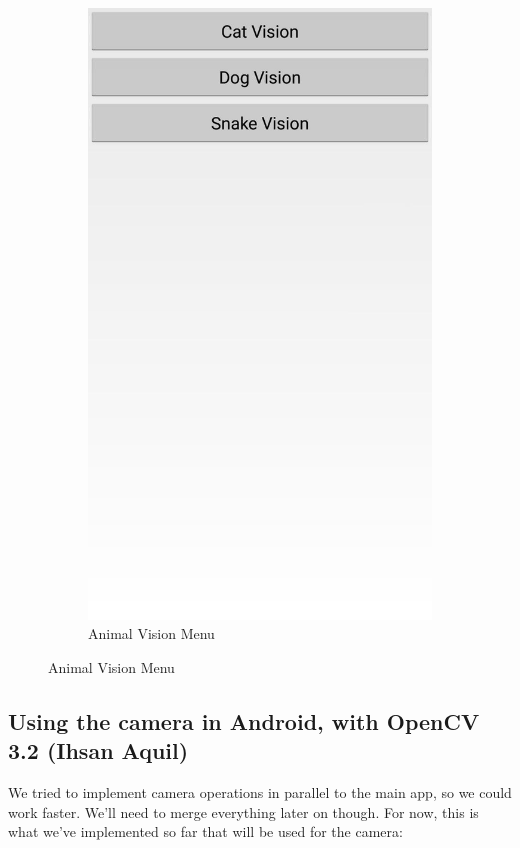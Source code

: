 \documentclass[12pt]{article}
\begin{document}
\begin{figure}[h]
\begin{subfigure}{.25\textwidth}
	\includegraphics[width=.9\linewidth]{ApplicationScreenshots/AnimalVision.jpg}
	\caption*{Animal Vision Menu}
\end{subfigure}
\end{figure}


\subsection{Using the camera in Android, with OpenCV 3.2 (Ihsan Aquil)}

We tried to implement camera operations in parallel to the main app, so we could work faster. We'll need to merge everything later on though. For now, this is what we've implemented so far that will be used for the camera:
\end{document}
